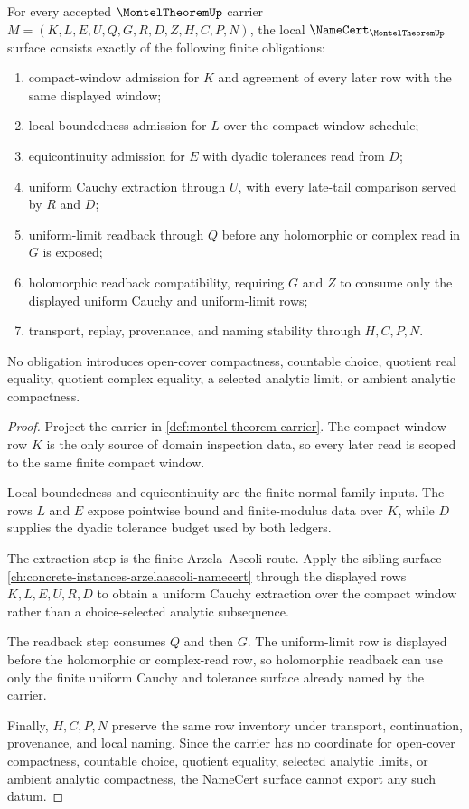 \begin{theorem}
\label{thm:montel-theorem-namecert-obligations}
For every accepted $\MontelTheoremUp$ carrier $M=(K,L,E,U,Q,G,R,D,Z,H,C,P,N)$, the local $\NameCert_{\MontelTheoremUp}$ surface consists exactly of the following finite obligations:
\begin{enumerate}
\item compact-window admission for $K$ and agreement of every later row with the same displayed window;
\item local boundedness admission for $L$ over the compact-window schedule;
\item equicontinuity admission for $E$ with dyadic tolerances read from $D$;
\item uniform Cauchy extraction through $U$, with every late-tail comparison served by $R$ and $D$;
\item uniform-limit readback through $Q$ before any holomorphic or complex read in $G$ is exposed;
\item holomorphic readback compatibility, requiring $G$ and $Z$ to consume only the displayed uniform Cauchy and uniform-limit rows;
\item transport, replay, provenance, and naming stability through $H,C,P,N$.
\end{enumerate}
No obligation introduces open-cover compactness, countable choice, quotient real equality, quotient complex equality, a selected analytic limit, or ambient analytic compactness.
\end{theorem}
\begin{proof}
Project the carrier in \autoref{def:montel-theorem-carrier}. The compact-window row $K$ is the only source of domain inspection data, so every later read is scoped to the same finite compact window.

Local boundedness and equicontinuity are the finite normal-family inputs. The rows $L$ and $E$ expose pointwise bound and finite-modulus data over $K$, while $D$ supplies the dyadic tolerance budget used by both ledgers.

The extraction step is the finite Arzela--Ascoli route. Apply the sibling surface \autoref{ch:concrete-instances-arzelaascoli-namecert} through the displayed rows $K,L,E,U,R,D$ to obtain a uniform Cauchy extraction over the compact window rather than a choice-selected analytic subsequence.

The readback step consumes $Q$ and then $G$. The uniform-limit row is displayed before the holomorphic or complex-read row, so holomorphic readback can use only the finite uniform Cauchy and tolerance surface already named by the carrier.

Finally, $H,C,P,N$ preserve the same row inventory under transport, continuation, provenance, and local naming. Since the carrier has no coordinate for open-cover compactness, countable choice, quotient equality, selected analytic limits, or ambient analytic compactness, the NameCert surface cannot export any such datum.
\end{proof}

